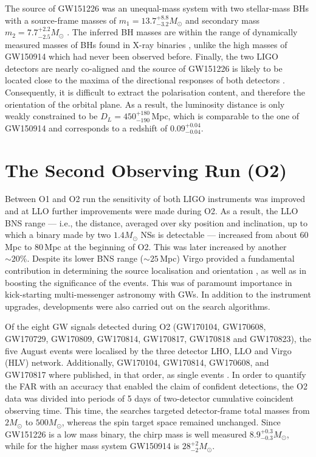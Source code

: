 \documentclass[binding=0.6cm, LaM]{sapthesis}
\begin{document}
	The source of GW151226 was an unequal-mass system with two stellar-mass BHs 
	with a source-frame masses of $m_1 = 13.7^{+8.8}_{-3.2}M_\odot$ 
	and secondary mass $m_2 = 7.7^{+2.2}_{-2.5}M_\odot$ \cite{13}. 
	The inferred BH masses are within the range of dynamically measured masses 
	of BHs found in X-ray binaries \cite{128, 129, 130, 132}, 
	unlike the high masses of GW150914 which had never been observed before. 
	Finally, the two LIGO detectors are nearly co-aligned and the source of GW151226 
	is likely to be located close to the maxima of the directional responses of both detectors \cite{28}. 
	Consequently, it is difficult to extract the polarisation content, and therefore the orientation of the orbital plane. 
	As a result, the luminosity distance is only weakly constrained to be $D_L = 450^{+180}_{-190}\,$Mpc, 
	which is comparable to the one of GW150914 and corresponds to a redshift of $0.09^{+0.04}_{-0.04}$.


\section{The Second Observing Run (O2)}
	Between O1 and O2 run the sensitivity of both LIGO instruments was improved and 
	at LLO further improvements were made during O2. 
	As a result, the LLO BNS range --- i.e., the distance, averaged over sky position and inclination, 
	up to which a binary made by two $1.4M_\odot$ NSs is detectable --- 
	increased from about 60\,Mpc to 80\,Mpc at the beginning of O2.
	This was later increased by another $\sim 20\%$.
 	Despite its lower BNS range ($\sim 25\,$Mpc) Virgo provided a fundamental contribution 
	in determining the source localisation and orientation \cite{56}, 
	as well as in boosting the significance of the events. 
	This was of paramount importance in kick-starting multi-messenger astronomy with GWs.
	In addition to the instrument upgrades, developments were also carried out on
	the search algorithms.
 
	Of the eight GW signals detected during O2 
	(GW170104, GW170608, GW170729, GW170809, GW170814, GW170817, GW170818 and GW170823), 
	the five August events were localised by the three detector LHO, LLO and Virgo (HLV) network.
	Additionally, GW170104, GW170814, GW170608, and GW170817 where published, 
	in that order, as single events \cite{60,61,62,138}.
	In order to quantify the FAR with an accuracy that enabled the claim of confident detections, 
	the O2 data was divided into periods of 5 days of two-detector cumulative coincident observing time.
	This time, the searches targeted detector-frame total masses from $2M_\odot$ to $500 M_\odot$, 
	whereas the spin target space remained unchanged.
	Since GW151226 is a low mass binary, the chirp mass is well measured $8.9^{+0.3}_{-0.3} M_\odot$,
	while for the higher mass system GW150914 is $28^{+2}_{-2}M_\odot$.
\end{document}
